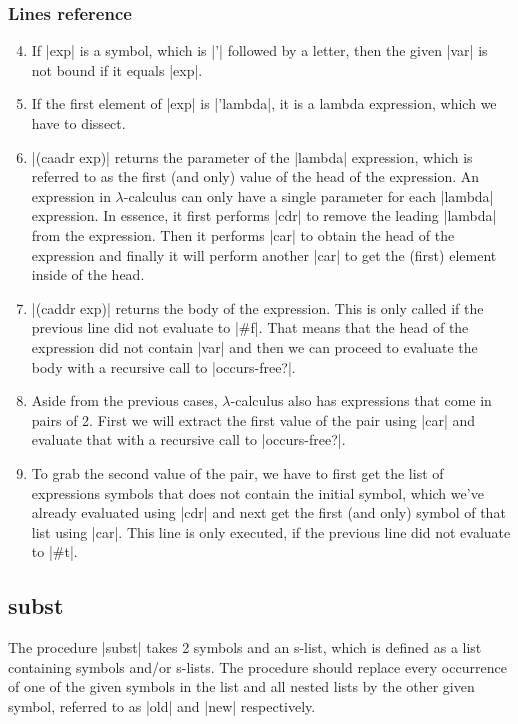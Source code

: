 \documentclass[a4paper]{article}
\begin{document}
\subsubsection*{Lines reference}

\begin{enumerate}
\setcounter{enumi}{3}
\item If |exp| is a symbol, which is |'| followed by a letter, then the given |var| is not bound if it equals |exp|.
\item If the first element of |exp| is |'lambda|, it is a lambda expression, which we have to dissect.
\setcounter{enumi}{6}
\item |(caadr exp)| returns the parameter of the |lambda| expression, which is referred to as the first (and only) value of the head of the expression. An expression in $\lambda$-calculus can only have a single parameter for each |lambda| expression. In essence, it first performs |cdr| to remove the leading |lambda| from the expression. Then it performs |car| to obtain the head of the expression and finally it will perform another |car| to get the (first) element inside of the head.
\item |(caddr exp)| returns the body of the expression. This is only called if the previous line did not evaluate to |#f|. That means that the head of the expression did not contain |var| and then we can proceed to evaluate the body with a recursive call to |occurs-free?|.
\setcounter{enumi}{10}
\item Aside from the previous cases, $\lambda$-calculus also has expressions that come in pairs of 2. First we will extract the first value of the pair using |car| and evaluate that with a recursive call to |occurs-free?|.
\item To grab the second value of the pair, we have to first get the list of expressions symbols that does not contain the initial symbol, which we've already evaluated using |cdr| and next get the first (and only) symbol of that list using |car|. This line is only executed, if the previous line did not evaluate to |#t|.
\end{enumerate}

\subsection{subst}

The procedure |subst| takes 2 symbols and an s-list, which is defined as a list containing symbols and/or s-lists. The procedure should replace every occurrence of one of the given symbols in the list and all nested lists by the other given symbol, referred to as |old| and |new| respectively.
\end{document}
